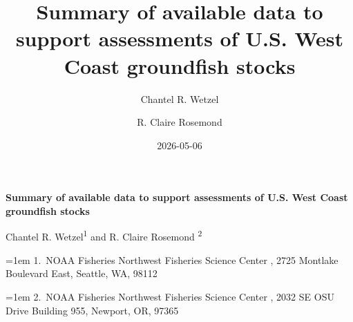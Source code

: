 \documentclass[
  english,
]{article}
\title{Summary of available data to support assessments of U.S. West
Coast groundfish stocks}
\author{Chantel R. Wetzel \and R. Claire Rosemond}
\date{2026-05-06}
\begin{document}
  \begin{titlepage}

  \begin{minipage}[b][\textheight][s]{\textwidth}


  \raggedright




  {\huge\bfseries\nohyphens{Summary of available data to support
  assessments of U.S. West Coast groundfish stocks}}\\[1\baselineskip]



  \vspace{1\baselineskip}


  \vspace{1\baselineskip}

   {\large{Chantel R. Wetzel}}{\textsuperscript{1}}%
  { and \large{R. Claire Rosemond}}%
  {\textsuperscript{2}}%



  \vspace{2\baselineskip}

  \hangindent=1em
  {1}.~{NOAA Fisheries Northwest Fisheries Science Center}%
  , %
  {2725 Montlake Boulevard East, Seattle, WA, 98112}%
  \par\hangindent=1em%
  {2}.~{NOAA Fisheries Northwest Fisheries Science Center}%
  , %
  {2032 SE OSU Drive Building 955, Newport, OR, 97365}%



\end{minipage}
\end{titlepage}
\end{document}
